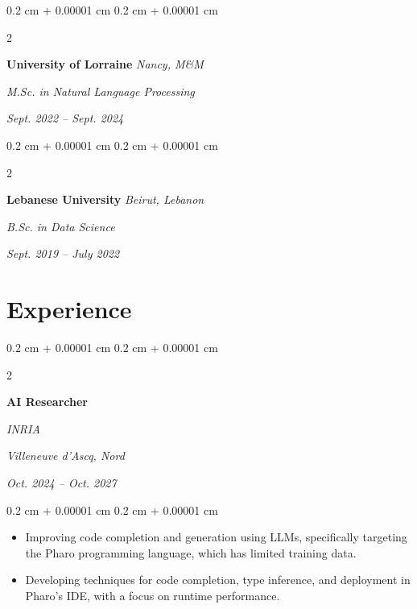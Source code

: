 \documentclass[10pt, letterpaper]{article}
\newenvironment{highlights}{
    \begin{itemize}[
        topsep=0.10 cm,
        parsep=0.10 cm,
        partopsep=0pt,
        itemsep=0pt,
        leftmargin=0.4 cm + 10pt
    ]
}{
    \end{itemize}
} %
\newenvironment{onecolentry}{
    \begin{adjustwidth}{
        0.2 cm + 0.00001 cm
    }{
        0.2 cm + 0.00001 cm
    }
}{
    \end{adjustwidth}
} %
\newenvironment{twocolentry}[2][]{
    \onecolentry
    \def\secondColumn{#2}
    \setcolumnwidth{\fill, 4.5 cm}
    \begin{paracol}{2}
}{
    \switchcolumn \raggedleft \secondColumn
    \end{paracol}
    \endonecolentry
} %
\begin{document}
        \begin{twocolentry}{
            \textit{Sept. 2022 – Sept. 2024}}
            \textbf{University of Lorraine}
            \textit{Nancy, M\&M}

            \textit{M.Sc. in Natural Language Processing}
        \end{twocolentry}
        \vspace{0.10 cm}

        \begin{twocolentry}{
            \textit{Sept. 2019 – July 2022}}
            \textbf{Lebanese University}
            \textit{Beirut, Lebanon}

            \textit{B.Sc. in Data Science}
        \end{twocolentry}

        \vspace{0.10 cm}

    \section{Experience}


        \begin{twocolentry}{
            \textit{Villeneuve d'Ascq, Nord}    
                
            \textit{Oct. 2024 – Oct. 2027}}
                \textbf{AI Researcher}
                
                \textit{INRIA}
        \end{twocolentry} 

        \vspace{0.10 cm}
        \begin{onecolentry}
            \begin{highlights}
                \item Improving code completion and generation using LLMs, specifically targeting the Pharo programming language, which has limited training data. 
                \item Developing techniques for code completion, type inference, and deployment in Pharo’s IDE, with a focus on runtime performance.
            \end{highlights}
        \end{onecolentry}
        \vspace{0.2 cm}
\end{document}

